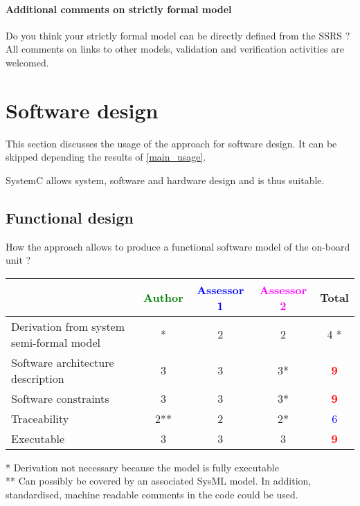 \paragraph{Additional comments on strictly formal model} Do you think your strictly formal model can be directly defined from the SSRS ?
All comments on links to other models, validation and verification activities are welcomed.


\section{Software design}
This section discusses the usage of the approach for software design.
It can be skipped depending the results of \ref{main_usage}.

\begin{author_comment}
SystemC allows system, software and hardware design and is thus suitable.
\end{author_comment}

\subsection{Functional design}

How the approach allows to produce a functional software model of the on-board unit ?

\begin{tabular}{|l | c | c | c | c|}
\hline
& \textcolor{green}{Author} & \textcolor{blue}{Assessor 1} & \textcolor{magenta}{Assessor 2} & Total \\
\hline
Derivation from system semi-formal model &* &2 &2 & 4   * \\
\hline
Software architecture description &3 &3 &3* & \textcolor{red}{\textbf{9}} \\
\hline
Software constraints &3 &3 &3* & \textcolor{red}{\textbf{9}} \\
\hline
Traceability &2** &2 &2* & \textcolor{blue}{6} \\
\hline
Executable &3 &3 &3 & \textcolor{red}{\textbf{9}} \\
\hline
\end{tabular}

\begin{author_comment}
* Derivation not necessary because the model is fully executable\\
** Can possibly be covered by an associated SysML model. In addition, standardised, machine readable comments in the code could be used.\\
\end{author_comment}

